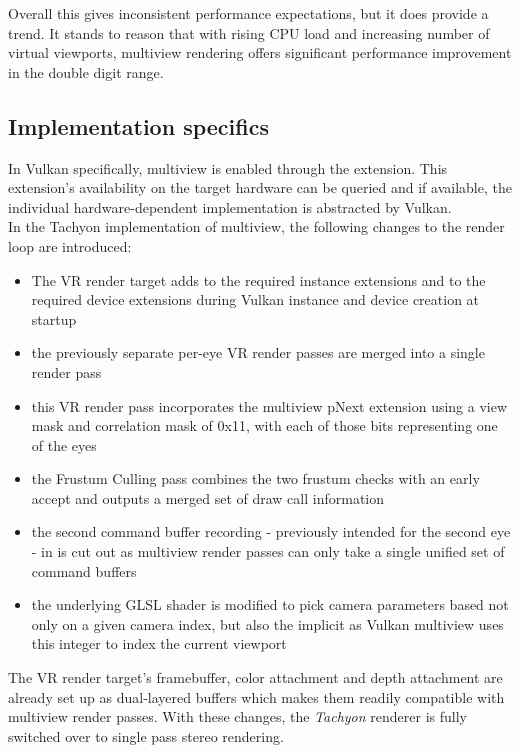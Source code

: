Overall this gives inconsistent performance expectations, but it does provide a trend. It stands to reason that with rising CPU load and increasing number of virtual viewports, multiview rendering offers significant performance improvement in the double digit range. 

\subsection{Implementation specifics}
In Vulkan specifically, multiview is enabled through the  extension. This extension's availability on the target hardware can be queried and if available, the individual hardware-dependent implementation is abstracted by Vulkan. \\
In the Tachyon implementation of multiview, the following changes to the render loop are introduced: 
\begin{itemize}
\item The VR render target adds  to the required instance extensions and  to the required device extensions during Vulkan instance and device creation at startup
\item the previously separate per-eye VR render passes are merged into a single render pass
\item this VR render pass incorporates the multiview pNext extension using a view mask and correlation mask of 0x11, with each of those bits representing one of the eyes
\item the Frustum Culling pass combines the two frustum checks with an early accept and outputs a merged set of draw call information
\item the second command buffer recording - previously intended for the second eye - in  is cut out as multiview render passes can only take a single unified set of command buffers
\item the underlying GLSL shader is modified to pick camera parameters based not only on a given camera index, but also the implicit  as Vulkan multiview uses this integer to index the current viewport
\end{itemize}
The VR render target's framebuffer, color attachment and depth attachment are already set up as dual-layered buffers which makes them readily compatible with multiview render passes. With these changes, the \textit{Tachyon} renderer is fully switched over to single pass stereo rendering. 